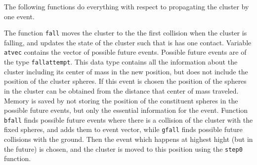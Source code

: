 \documentclass[12pt]{article}
\begin{document}
The following functions do everything with respect to propagating the cluster by one event. 

The function \texttt{fall} moves the cluster to the the first collision when the cluster is falling, and updates the state of the cluster such that is has one contact. Variable \texttt{atvec} contains the vector of possible future events. Possible future events are of the type \texttt{fallattempt}. This data type contains all the information about the cluster including its center of mass in the new position, but does not include the position of the cluster spheres. If this event is chosen the position of the spheres in the cluster can be obtained from the distance that center of mass traveled. Memory is saved by not storing the position of the constituent spheres in the possible future events, but only the essential information for the event. Function \texttt{bfall} finds possible future events where there is a collision of the cluster with the fixed spheres, and adds them to event vector, while \texttt{gfall} finds possible future collisions with the ground. Then the event which happens at highest hight (but in the future) is chosen, and the cluster is moved to this position using the \texttt{step0} function.
\end{document}
